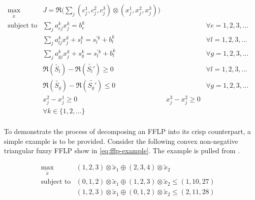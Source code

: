 \documentclass[ee,thesis]{usuthesis}
\begin{document}
\begin{equation}
\label{eq:kumar-kaurs-crisp}
\begin{array}{lllc}
\underset{{\tilde{x}}}{\text{max}} & J = \mathfrak{R}\Big(\sum_j (c_j^1,c_j^2,c_j^3) \otimes (x_j^1,x_j^2,x_j^3)\Big) &                             &                                          \\
\text{subject to}  & \sum_j a_{ej}^k x_j^k = b_e^k                                &                                &   \forall e = 1,2,3,...        \\
                   & \sum_j a_{lj}^k x_j^k + s_l^k = s_l^{'k} + b_l^k                 &                                &   \forall l = 1,2,3,...       \\
                   & \sum_j a_{gj}^k x_j^k + s_g^k = s_l^{'k} + b_l^k                 &                                &   \forall g = 1,2,3,...      \\
                   & \mathfrak{R}(\tilde{S_l}) - \mathfrak{R}(\tilde{S_l'}) \ge 0                      &                                &  \forall l = 1,2,3,...          \\
                   & \mathfrak{R}(\tilde{S_g}) - \mathfrak{R}(\tilde{S_g'}) \le 0                      &                                &  \forall g = 1,2,3,...          \\
                   & x_j^2 - x_j^1 \ge 0                                         & x_j^3 - x_j^2 \ge 0              &         \\
                   & \forall k \in \{1,2,...\}                                            &                            &                       \\
\end{array}
\end{equation}

\label{sec:fully-fuzzy-linear-programming-example}
To demonstrate the process of decomposing an FFLP into its crisp counterpart, a simple example is to be provided.
Consider the following convex non-negative triangular fuzzy FFLP show in \ref{eq:fflp-example}. The example is pulled from
\cite{nasseri-2013-fully}.

\begin{equation}
\label{eq:fflp-example}
\begin{array}{ll}
\underset{{\tilde{x}}}{\text{max}} & (1,2,3) \otimes \tilde{x}_1 \oplus (2,3,4) \otimes \tilde{x}_2 \\
\text{subject to}                  & (0,1,2) \otimes \tilde{x}_1 \oplus (1,2,3) \otimes \tilde{x}_2 \le (1,10,27) \\
                                   & (1,2,3) \otimes \tilde{x}_1 \oplus (0,1,2) \otimes \tilde{x}_2 \le (2,11,28)
\end{array}
\end{equation}
\end{document}

